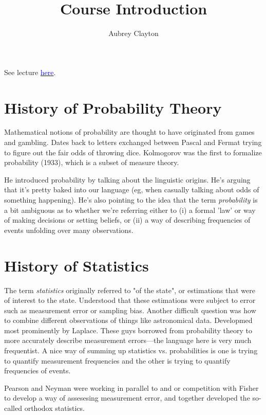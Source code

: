 \documentclass{article}
\begin{document}
\title{Course Introduction}
\author{Aubrey Clayton}
\maketitle

See lecture \href{https://www.youtube.com/watch?v=rfKS69cIwHc&list=PL9v9IXDsJkktefQzX39wC2YG07vw7DsQ_&index=1}{\textcolor{blue}{here}}.

\section{History of Probability Theory}

Mathematical notions of probability are thought to have originated from games and
gambling. Dates back to letters exchanged between Pascal and Fermat trying to figure out
the fair odds of throwing dice. Kolmogorov was the first to formalize probability (1933),
which is a subset of measure theory.

He introduced probability by talking about the linguistic origins. He's arguing that it's
pretty baked into our language (eg, when casually talking about odds of something
happening). He's also pointing to the idea that the term \emph{probability} is a bit
ambiguous as to whether we're referring either to (i) a formal 'law' or way of making
decisions or setting beliefs, or (ii) a way of describing frequencies of events unfolding over many
observations. 

\section{History of Statistics}

The term \emph{statistics} originally referred to "of the state", or estimations that were
of interest to the state. Understood that these estimations were subject to error such as
measurement error or sampling bias. Another difficult question was how to combine
different observations of things like astronomical data. Developmed most prominently by
Laplace. These guys borrowed from probability theory to more accurately describe
measurement errors---the language here is very much frequentist. A nice way of summing up
statistics vs. probabilities is one is trying to quantify measurement frequencies and the other
is trying to quantify frequencies of events.

Pearson and Neyman were working in parallel to and or competition with Fisher to develop a
way of assesesing measurement error, and together developed the so-called orthodox
statistics.
\end{document}
